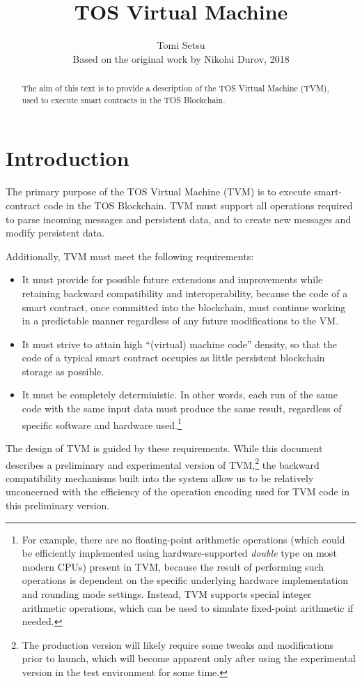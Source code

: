 \documentclass[12pt,oneside]{article}
\title{TOS Virtual Machine}
\author{Tomi Setsu\\[0.3em]
\small Based on the original work by Nikolai Durov, 2018}
\def\markbothsame#1{\fancyhead[C]{#1}}
\begin{document}
\maketitle

\begin{abstract}
  The aim of this text is to provide a description of the TOS Virtual
  Machine (TVM), used to execute smart
  contracts in the TOS Blockchain.
\end{abstract}

\section*{Introduction}
\markbothsame{Introduction}

The primary purpose of the TOS Virtual Machine (TVM) is to execute smart-contract code in the TOS Blockchain. TVM must support all operations required to parse incoming messages and persistent data, and to create new messages and modify persistent data.

Additionally, TVM must meet the following requirements:
\begin{itemize}
\item It must provide for possible future extensions and improvements while retaining backward compatibility and interoperability, because the code of a smart contract, once committed into the blockchain, must continue working in a predictable manner regardless of any future modifications to the VM.
\item It must strive to attain high ``(virtual) machine code'' density, so that the code of a typical smart contract occupies as little persistent block\-chain storage as possible.
\item It must be completely deterministic. In other words, each run of the same code with the same input data must produce the same result, regardless of specific software and hardware used.\footnote{For example, there are no floating-point arithmetic operations (which could be efficiently implemented using hardware-supported {\em double\/} type on most modern CPUs) present in TVM, because the result of performing such operations is dependent on the specific underlying hardware implementation and rounding mode settings. Instead, TVM supports special integer arithmetic operations, which can be used to simulate fixed-point arithmetic if needed.}
\end{itemize}
The design of TVM is guided by these requirements. While this document describes a preliminary and experimental version of TVM,\footnote{The production version will likely require some tweaks and modifications prior to launch, which will become apparent only after using the experimental version in the test environment for some time.} the backward compatibility mechanisms built into the system allow us to be relatively unconcerned with the efficiency of the operation encoding used for TVM code in this preliminary version.
\end{document}
